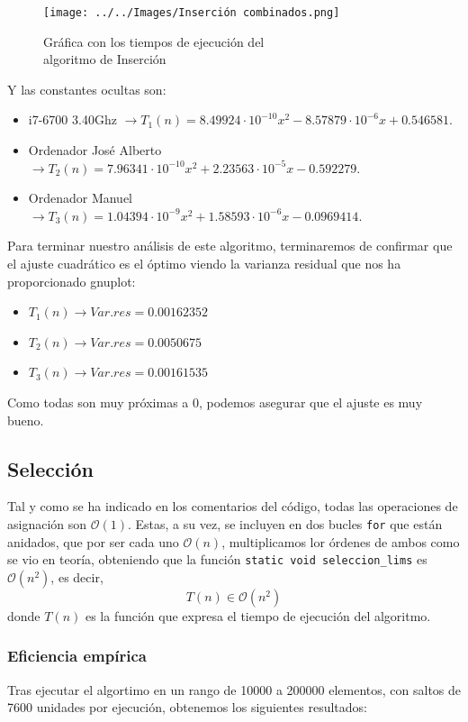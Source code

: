 \documentclass[10pt,a4paper]{article}
\begin{document}
\begin{figure}[h!]
	\centering
	\texttt{[image: ../../Images/Inserción combinados.png]}
	\caption{Gráfica con los tiempos de ejecución del \\algoritmo de Inserción}
\end{figure}

Y las constantes ocultas son:

\begin{itemize}
	\item i7-6700 3.40Ghz \(\rightarrow T_1(n) = 8.49924 \cdot 10^{-10} x^2 - 8.57879 \cdot 10^{-6} x + 0.546581\).
	\item Ordenador José Alberto \(\rightarrow T_2(n) = 7.96341 \cdot 10^{-10} x^2 + 2.23563 \cdot 10^{-5} x - 0.592279\).
	\item Ordenador Manuel \(\rightarrow T_3(n) = 1.04394 \cdot 10^{-9} x^2 + 1.58593 \cdot 10^{-6} x - 0.0969414\).
\end{itemize}

Para terminar nuestro análisis de este algoritmo, terminaremos de confirmar que el ajuste cuadrático es el óptimo viendo la varianza residual que nos ha proporcionado gnuplot:

\begin{itemize}
	\item \(T_1(n) \longrightarrow Var.res = 0.00162352\)
	\item \(T_2(n) \longrightarrow Var.res = 0.0050675\)
	\item \(T_3(n) \longrightarrow Var.res = 0.00161535\)
\end{itemize}

Como todas son muy próximas a 0, podemos asegurar que el ajuste es muy bueno.

\subsection{Selección}

Tal y como se ha indicado en los comentarios del código, todas las operaciones de asignación son \(\mathcal{O}(1)\). Estas, a su vez, se incluyen en dos bucles \texttt{for} que están anidados, que por ser cada uno \(\mathcal{O}(n)\), multiplicamos lor órdenes de ambos como se vio en teoría, obteniendo que la función \texttt{static void seleccion\_lims} es \(\mathcal{O}(n^2)\), es decir,
\[
T(n) \in \mathcal{O}(n^2)
\]
donde \(T(n)\) es la función que expresa el tiempo de ejecución del algoritmo.

\subsubsection{Eficiencia empírica}
Tras ejecutar el algortimo en un rango de 10000 a 200000 elementos, con saltos de 7600 unidades por ejecución, obtenemos los siguientes resultados:
\end{document}
